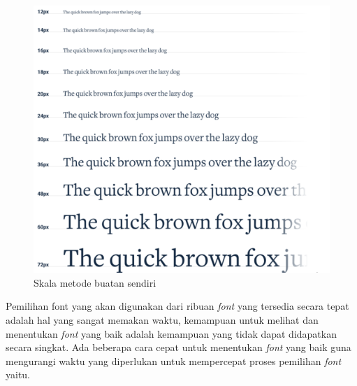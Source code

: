 \begin{figure}[H]
	\centering
	\includegraphics[keepaspectratio, width=12cm]{gambar/refactoring-ui-g7.png}
	\caption{Skala metode buatan sendiri \citep{refactoringui}}
	\label{gambar:refactoring-ui-g7.png}
\end{figure}

Pemilihan font yang akan digunakan dari ribuan \textit{font} yang tersedia secara tepat adalah hal yang sangat memakan waktu, kemampuan untuk melihat dan menentukan \textit{font} yang baik adalah kemampuan yang tidak dapat didapatkan secara singkat. Ada beberapa cara cepat untuk menentukan \textit{font} yang baik guna mengurangi waktu yang diperlukan untuk mempercepat proses pemilihan \textit{font} yaitu. 

